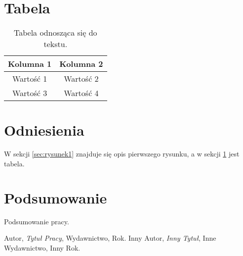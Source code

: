 \documentclass[polski]{article}
\begin{document}
\section{Tabela}
\begin{table}[h]
    \centering
    \begin{tabular}{|c|c|}
        \hline
        Kolumna 1 & Kolumna 2 \\
        \hline
        Wartość 1 & Wartość 2 \\
        Wartość 3 & Wartość 4 \\
        \hline
    \end{tabular}
    \caption{Tabela odnosząca się do tekstu.}
    \label{sec:tabela}
\end{table}

\section{Odniesienia}
W sekcji \ref{sec:rysunek1} znajduje się opis pierwszego rysunku, a w sekcji \ref{sec:tabela} jest tabela.

\section{Podsumowanie}
Podsumowanie pracy.

\begin{thebibliography}{99}
     Autor, \emph{Tytuł Pracy}, Wydawnictwo, Rok.
     Inny Autor, \emph{Inny Tytuł}, Inne Wydawnictwo, Inny Rok.
\end{thebibliography}
\end{document}
